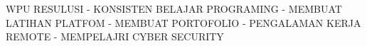 WPU RESULUSI
- KONSISTEN BELAJAR PROGRAMING
- MEMBUAT LATIHAN PLATFOM
- MEMBUAT PORTOFOLIO
- PENGALAMAN KERJA REMOTE
- MEMPELAJRI CYBER SECURITY

